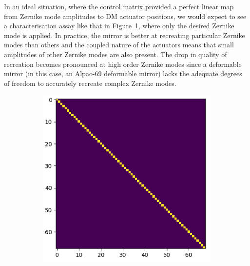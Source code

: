 In an ideal situation, where the control matrix provided a perfect linear map from Zernike mode amplitudes to DM actuator positions, we would expect to see a characterisation assay like that in Figure~\ref{fig:characterisation_assay_ideal}, where only the desired Zernike mode is applied. In practice, the mirror is better at recreating particular Zernike modes than others and the coupled nature of the actuators means that small amplitudes of other Zernike modes are also present. The drop in quality of recreation becomes pronounced at high order Zernike modes since a deformable mirror (in this case, an Alpao-69 deformable mirror) lacks the adequate degrees of freedom to accurately recreate complex Zernike modes.

\begin{figure}[h]
	\centering
	\begin{subfigure}{0.45\textwidth}
		\centering
		\includegraphics[width=0.8\linewidth, scale=0.5]{./images/characterisation_assay_ideal.png}
		\caption{}
		\label{fig:characterisation_assay_ideal}
	\end{subfigure}
	\begin{subfigure}{0.45\textwidth}
		\centering

\end{subfigure}
\end{figure}
